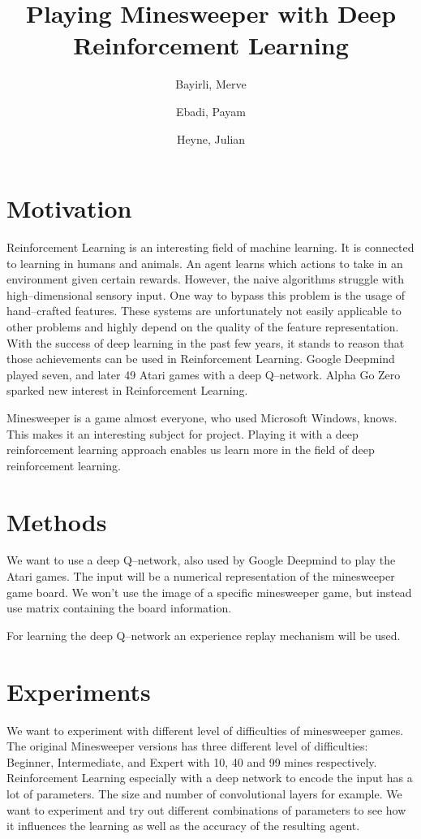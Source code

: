 \documentclass[Optionen]{scrartcl}
\title{Playing Minesweeper with Deep Reinforcement Learning}
\author{Bayirli, Merve \and Ebadi, Payam \and Heyne, Julian}
\begin{document}
    \maketitle
    \section{Motivation}
    Reinforcement Learning is an interesting field of machine learning.
    It is connected to learning in humans and animals.
    An agent learns which actions to take in an environment given certain rewards.
    However, the naive algorithms struggle with high--dimensional sensory input.
    One way to bypass this problem is the usage of hand--crafted features.
    These systems are unfortunately not easily applicable to other problems and highly depend on the quality of the feature representation.
    With the success of deep learning in the past few years, it stands to reason that those achievements can be used in Reinforcement Learning.
    Google Deepmind played seven, and later 49 Atari games with a deep Q--network.
    Alpha Go Zero sparked new interest in Reinforcement Learning.
    
    Minesweeper is a game almost everyone, who used Microsoft Windows, knows.
    This makes it an interesting subject for project.
    Playing it with a deep reinforcement learning approach enables us learn more in the field of deep reinforcement learning.
    \section{Methods}
    We want to use a deep Q--network, also used by Google Deepmind to play the Atari games.
    The input will be a numerical representation of the minesweeper game board.
    We won't use the image of a specific minesweeper game, but instead use matrix containing the board information.
    
    For learning the deep Q--network an experience replay mechanism will be used.
    \section{Experiments}
    We want to experiment with different level of difficulties of minesweeper games.
    The original Minesweeper versions has three different level of difficulties: Beginner, Intermediate, and Expert with 10, 40 and 99 mines respectively.
    Reinforcement Learning especially with a deep network to encode the input has a lot of parameters.
    The size and number of convolutional layers for example.
    We want to experiment and try out different combinations of parameters to see how it influences the learning as well as the accuracy of the resulting agent.
\end{document}
